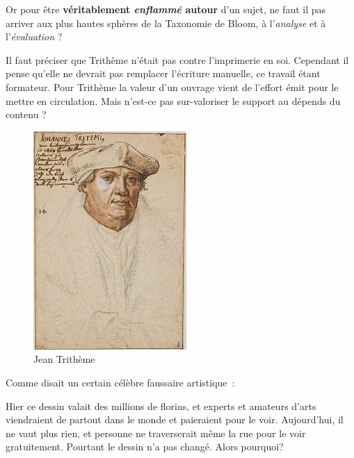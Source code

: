 \begin{minipage}[H]{0.54\linewidth}
Or pour être \textbf{véritablement \emph{enflammé} autour} d'un sujet, ne faut il pas arriver aux plus hautes sphères de la Taxonomie de Bloom, à l'\emph{analyse} et à l'\emph{évaluation} ?

Il faut préciser que Trithème n'était pas contre l'imprimerie en soi. Cependant il pense qu'elle ne devrait pas remplacer l'écriture manuelle, ce travail étant formateur\cite{abbot-trithemius}. Pour Trithème la valeur d'un ouvrage vient de l'effort émit pour le mettre en circulation. Mais n'est-ce pas sur-valoriser le support au dépends du contenu ?
\vspace{1cm}
\end{minipage}
\begin{minipage}[H]{0.44\linewidth}
  \begin{figure}[H]
  \centering
  \includegraphics[height=0.15\paperheight]{../resources/illustrations/trithemius}
  \caption{Jean Trithème}
  \end{figure}
\end{minipage}

Comme disait un certain célèbre faussaire artistique~: 

\begin{coolquote}
Hier ce dessin valait des millions de florins, et experts et amateurs d'arts viendraient de partout dans le monde et paieraient pour le voir. Aujourd'hui, il ne vaut plus rien, et personne ne traverserait même la rue pour le voir gratuitement. Pourtant le dessin n'a pas changé. Alors pourquoi?
\end{coolquote}

